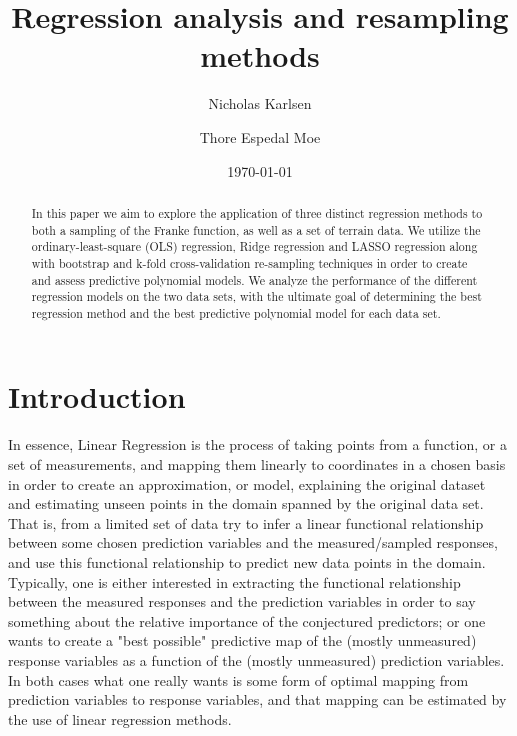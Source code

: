 \documentclass[reprint, english, nofootinbib]{revtex4-2}
\begin{document}
\title{Regression analysis and resampling methods}
\author{Nicholas Karlsen}
\author{Thore Espedal Moe}
\date{\today}

\begin{abstract}
    \noindent
   In this paper we aim to explore the application of three distinct regression methods to both a sampling of the Franke function, as well as a set of terrain data. We utilize the ordinary-least-square (OLS) regression, Ridge regression and LASSO regression along with bootstrap and k-fold cross-validation re-sampling techniques in order to create and assess predictive polynomial models. We analyze the performance of the different regression models on the two data sets, with the ultimate goal of determining the best regression method and the best predictive polynomial model for each data set.
\end{abstract}

\maketitle

\section{Introduction}
    \noindent
        In essence, Linear Regression is the process of taking points from a function, or a set of measurements, and mapping them linearly to coordinates in a chosen basis in order to create an approximation, or model, explaining the original dataset and estimating unseen points in the domain spanned by the original data set. That is, from a limited set of data try to infer a linear functional relationship between some chosen prediction variables and the measured/sampled responses, and use this functional relationship to predict new data points in the domain. Typically, one is either interested in extracting the functional relationship between the measured responses and the prediction variables in order to say something about the relative importance of the conjectured predictors; or one wants to create a "best possible" predictive map of the (mostly unmeasured) response variables as a function of the (mostly unmeasured) prediction variables. In both cases what one really wants is some form of optimal mapping from prediction variables to response variables, and that mapping can be estimated by the use of linear regression methods.
\end{document}
